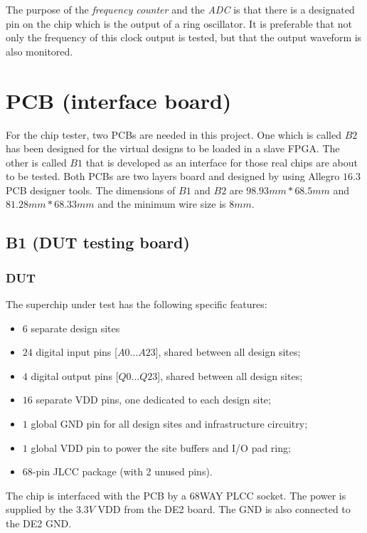 The purpose of the \textit{frequency counter} and the \textit{ADC} is that there is a designated pin on the chip which is the output of a ring oscillator. It is preferable that not only the frequency of this clock output is tested, but that the output waveform is also monitored.


\section{PCB (interface board)}

For the chip tester, two PCBs are needed in this project. One which is called $B2$ has been designed for the virtual designs to be loaded in a slave FPGA. The other is called $B1$ that is developed as an interface for those real chips are about to be tested. Both PCBs are two layers board and designed by using Allegro $16.3$ PCB designer tools. The dimensions of $B1$ and $B2$ are $98.93 mm* 68.5 mm$ and $81.28 mm * 68.33 mm$ and the minimum wire size is $8mm$.

\subsection{B1 (DUT testing board)}

\subsubsection{DUT}

The superchip under test has the following specific features:
\begin{itemize}
 \item $6$ separate design sites
 \item $24$ digital input pins [$A0\dots A23$], shared between all design sites;
 \item $4$ digital output pins [$Q0\dots Q23$], shared between all design sites;
 \item $16$ separate VDD pins, one dedicated to each design site;
 \item $1$ global GND pin for all design sites and infrastructure circuitry;
 \item $1$ global VDD pin to power the site buffers and I/O pad ring;
 \item $68$-pin JLCC package (with 2 unused pins).
\end{itemize}

The chip is interfaced with the PCB by a 68WAY PLCC socket. The power is supplied by the $3.3V$ VDD from the DE2 board. The GND is also connected to the DE2 GND.

